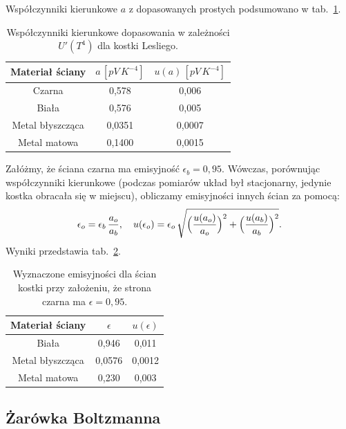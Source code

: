 \documentclass[12pt]{article}
\begin{document}
Współczynniki kierunkowe $a$ z dopasowanych prostych podsumowano w tab.~\ref{tab:cube_line}.

\begin{table}[H]
	\centering
	\begin{tabular}{c|cc}
		\toprule
		Materiał ściany & $a\,[pV\,K^{-4}]$ & $u(a)\,[pV\,K^{-4}]$ \\
		\midrule
		Czarna           & 0{,}578  & 0{,}006 \\
		Biała            & 0{,}576  & 0{,}005 \\
		Metal błyszcząca & 0{,}0351 & 0{,}0007 \\
		Metal matowa     & 0{,}1400 & 0{,}0015 \\
		\bottomrule
	\end{tabular}
	\caption{Współczynniki kierunkowe dopasowania w zależności $U'(T^4)$ dla kostki Lesliego.}
	\label{tab:cube_line}
\end{table}

Załóżmy, że ściana czarna ma emisyjność $\epsilon_b=0{,}95$. Wówczas, porównując współczynniki kierunkowe (podczas pomiarów układ był stacjonarny, jedynie kostka obracała się w miejscu), obliczamy emisyjności innych ścian za pomocą:
\begin{equation}
	\epsilon_o = \epsilon_b\,\frac{a_o}{a_b}, 
	\quad
	u(\epsilon_o) = \epsilon_o\,\sqrt{\Bigl(\frac{u(a_o)}{a_o}\Bigr)^2 + \Bigl(\frac{u(a_b)}{a_b}\Bigr)^2}.
	\label{eq:epsilon_ratio}
\end{equation}
Wyniki przedstawia tab.~\ref{tab:materials_emisity}.

\begin{table}[H]
	\centering
	\begin{tabular}{c|cc}
		\toprule
		Materiał ściany & $\epsilon$ & $u(\epsilon)$ \\
		\midrule
		Biała            & 0{,}946    & 0{,}011 \\
		Metal błyszcząca & 0{,}0576   & 0{,}0012 \\
		Metal matowa     & 0{,}230    & 0{,}003 \\
		\bottomrule
	\end{tabular}
	\caption{Wyznaczone emisyjności dla ścian kostki przy założeniu, że strona czarna ma $\epsilon=0{,}95$.}
	\label{tab:materials_emisity}
\end{table}

\subsection{Żarówka Boltzmanna}
\end{document}
